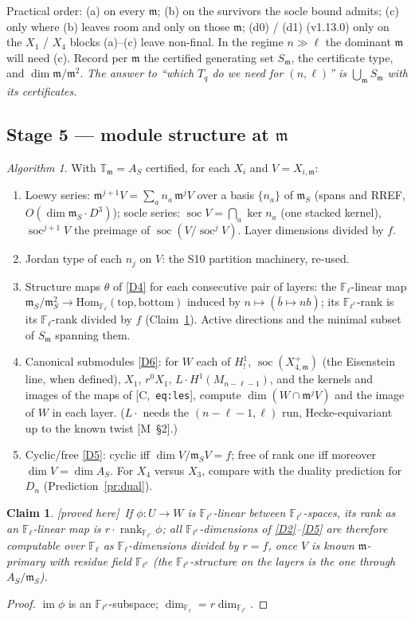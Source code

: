 \documentclass[11pt]{article}
\newtheorem{claim}[theorem]{Claim}
\theoremstyle{remark}
\newtheorem{algorithm}[theorem]{Algorithm}
\newcommand{\F}{\mathbb{F}}
\newcommand{\Hom}{\mathrm{Hom}}
\newcommand{\Fl}{\F_\ell}
\newcommand{\Flr}{\F_{\ell^r}}
\DeclareMathOperator{\rank}{rank}
\DeclareMathOperator{\im}{im}
\DeclareMathOperator{\soc}{soc}
\newcommand{\T}{\mathbb{T}}
\newcommand{\m}{\mathfrak{m}}
\newcommand{\Dn}{D_n}
\newcommand{\HA}[1]{[C,~\texttt{#1}]}      %
\newcommand{\Mnote}[1]{[M~\S#1]}            %
\newcommand{\PROVED}{\textsf{[proved here]}}
\begin{document}
Practical order: (a) on every $\m$; (b) on the survivors the socle bound admits; (c) only where
(b) leaves room and only on those $\m$; (d0) / (d1) (v1.13.0) only on the $X_1$ / $X_4$ blocks
(a)--(c) leave non-final. In the regime $n\gg\ell$ the dominant $\m$ will need (c). Record per $\m$
the certified generating set $S_\m$, the certificate type, and $\dim\m/\m^2$. \emph{The answer
to ``which $T_q$ do we need for $(n,\ell)$'' is $\bigcup_\m S_\m$ with its certificates.}

\subsection*{Stage 5 --- module structure at $\m$}
\begin{algorithm}\label{alg:stage5}
With $\T_\m=A_S$ certified, for each $X_i$ and $V=X_{i,\m}$:
\begin{enumerate}
\item Loewy series: $\m^{j+1}V=\sum_a n_a\,\m^jV$ over a basis $\{n_a\}$ of $\m_S$
  (spans and RREF, $O(\dim\m_S\cdot D^3)$); socle series:
  $\soc V=\bigcap_a\ker n_a$ (one stacked kernel), $\soc^{j+1}V$ the preimage of
  $\soc(V/\soc^jV)$. Layer dimensions divided by $f$.
\item Jordan type of each $n_j$ on $V$: the S10 partition machinery, re-used.
\item Structure maps $\theta$ of \ref{D4} for each consecutive pair of layers: the
  $\Fl$-linear map $\m_S/\m_S^2\to\Hom_{\Fl}(\text{top},\text{bottom})$ induced by
  $n\mapsto(\bar b\mapsto n b)$; its $\Flr$-rank is its $\Fl$-rank divided by $f$
  (Claim~\ref{cl:frank}). Active directions and the minimal subset of $S_\m$ spanning them.
\item Canonical submodules \ref{D6}: for $W$ each of $H^1_!$, $\soc(X^+_{4,\m})$ (the
  Eisenstein line, when defined), $X_1$, $r^0X_1$, $L\cdot H^1(M_{n-\ell-1})$, and the kernels
  and images of the maps of \HA{eq:les}, compute
  $\dim(W\cap\m^jV)$ and the image of $W$ in each layer. ($L\cdot$ needs the $(n-\ell-1,\ell)$ run,
  Hecke-equivariant up to the known twist \Mnote{2}.)
\item Cyclic/free \ref{D5}: cyclic iff $\dim V/\m_SV=f$; free of rank one iff moreover
  $\dim V=\dim A_S$. For $X_4$ versus $X_3$, compare with the duality prediction for $\Dn$
  (Prediction~\ref{pr:dual}).
\end{enumerate}
\end{algorithm}

\begin{claim}\label{cl:frank}\PROVED\
If $\phi:U\to W$ is $\Flr$-linear between $\Flr$-spaces, its rank as an $\Fl$-linear map is
$r\cdot\rank_{\Flr}\phi$; all $\Flr$-dimensions of \ref{D2}--\ref{D5} are therefore computable
over $\Fl$ as $\Fl$-dimensions divided by $r=f$, once $V$ is known $\m$-primary with residue
field $\Flr$ (the $\Flr$-structure on the layers is the one through $A_S/\m_S$).
\end{claim}
\begin{proof}
$\im\phi$ is an $\Flr$-subspace; $\dim_{\Fl}=r\dim_{\Flr}$.
\end{proof}
\end{document}
